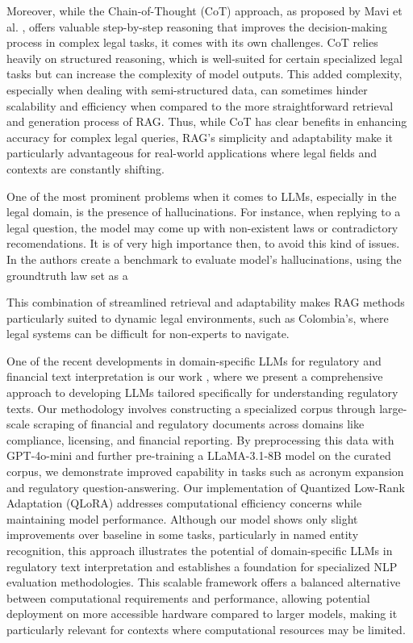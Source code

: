 Moreover, while the Chain-of-Thought (CoT) approach, as proposed by Mavi et al. 
\cite{mavi2023retrievalaugmentedchainofthoughtsemistructureddomains}, offers valuable 
step-by-step reasoning that improves the decision-making process in complex legal tasks, 
it comes with its own challenges. CoT relies heavily on structured reasoning, 
which is well-suited for certain specialized legal tasks but can increase the complexity 
of model outputs. This added complexity, especially when dealing with semi-structured data, 
can sometimes hinder scalability and efficiency when compared to the more straightforward 
retrieval and generation process of RAG. Thus, while CoT has clear benefits in 
enhancing accuracy for complex legal queries, RAG’s simplicity and adaptability 
make it particularly advantageous for real-world applications where legal fields 
and contexts are constantly shifting.

One of the most prominent problems when it comes to LLMs, especially in the legal domain, is the 
presence of hallucinations. For instance, when replying to a legal question, the model may come up
with non-existent laws or contradictory recomendations. It is of very high importance then, to avoid 
this kind of issues. In \cite{hu2025finetuninglargelanguagemodels} the authors create a benchmark
to evaluate model's hallucinations, using the groundtruth law set as a 

This combination of streamlined retrieval and adaptability makes RAG methods particularly 
suited to dynamic legal environments, such as Colombia's, where legal systems can be 
difficult for non-experts to navigate.

One of the recent developments in domain-specific LLMs for regulatory and financial text interpretation is our work \cite{martinez-etal-2025-scalable}, 
where we present a comprehensive approach to developing LLMs tailored specifically for understanding regulatory texts. 
Our methodology involves constructing a specialized corpus through large-scale scraping of financial and regulatory 
documents across domains like compliance, licensing, and financial reporting. 
By preprocessing this data with GPT-4o-mini and further pre-training a LLaMA-3.1-8B model on the curated corpus, 
we demonstrate improved capability in tasks such as acronym expansion and regulatory question-answering. 
Our implementation of Quantized Low-Rank Adaptation (QLoRA) addresses computational efficiency concerns while maintaining model performance. 
Although our model shows only slight improvements over baseline in some tasks, particularly in named entity recognition, 
this approach illustrates the potential of domain-specific LLMs in regulatory text interpretation and establishes a foundation for specialized NLP evaluation methodologies. 
This scalable framework offers a balanced alternative between computational requirements and performance, allowing potential deployment on more accessible hardware compared to larger models, 
making it particularly relevant for contexts where computational resources may be limited.
\endinput

